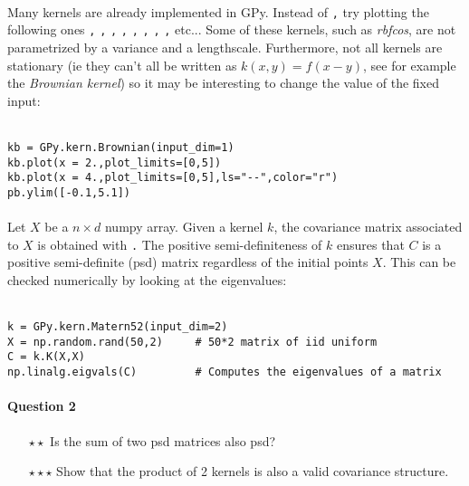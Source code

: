 \documentclass{article}
\newcommand{\mintinline}[1]{\colorbox{bg}{\lstinline[basicstyle=\ttfamily]{#1}}}
\begin{document}
\paragraph{}
Many kernels are already implemented in GPy. Instead of \texttt, try plotting the following ones \texttt, \texttt, \texttt, \texttt, \texttt, \texttt, \texttt, \texttt, etc... Some of these kernels, such as \textit{rbfcos}, are not parametrized by a variance and a lengthscale. Furthermore, not all kernels are stationary (ie they can't all be written as $k(x,y) = f(x-y)$, see for example the \textit{Brownian kernel}) so it may be interesting to change the value of the fixed input: \\ \ \\
\begin{verbatim}
kb = GPy.kern.Brownian(input_dim=1)
kb.plot(x = 2.,plot_limits=[0,5])
kb.plot(x = 4.,plot_limits=[0,5],ls="--",color="r")
pb.ylim([-0.1,5.1])
\end{verbatim}

\paragraph{}
Let $X$ be a $n \times d$ numpy array. Given a kernel $k$, the covariance matrix associated to $X$ is obtained with \texttt. The positive semi-definiteness of $k$ ensures that $C$ is a positive semi-definite (psd) matrix regardless of the initial points $X$. This can be checked numerically by looking at the eigenvalues: \\ \ \\
\begin{verbatim}
k = GPy.kern.Matern52(input_dim=2)
X = np.random.rand(50,2)     # 50*2 matrix of iid uniform
C = k.K(X,X)                 
np.linalg.eigvals(C)         # Computes the eigenvalues of a matrix
\end{verbatim}

\paragraph{Question 2}
\begin{itemize}
	\item[$\star \star$] Is the sum of two psd matrices also psd?
	\item[$\star \star \star$] Show that the product of 2 kernels is also a valid covariance structure.
\end{itemize}
\end{document}
